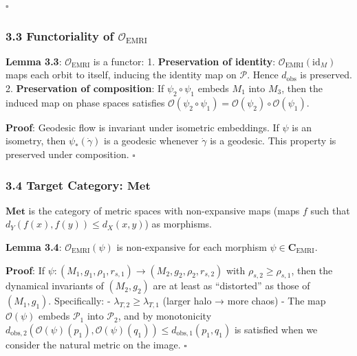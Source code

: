 \documentclass[
]{article}
\begin{document}
\(\square\)

\subsubsection{\texorpdfstring{3.3 Functoriality of
\(\mathcal{O}_{\text{EMRI}}\)}{3.3 Functoriality of \textbackslash mathcal\{O\}\_\{\textbackslash text\{EMRI\}\}}}\label{functoriality-of-mathcalo_textemri}

\textbf{Lemma 3.3}: \(\mathcal{O}_{\text{EMRI}}\) is a functor: 1.
\textbf{Preservation of identity}:
\(\mathcal{O}_{\text{EMRI}}(\text{id}_M)\) maps each orbit to itself,
inducing the identity map on \(\mathcal{P}\). Hence \(d_{\text{obs}}\)
is preserved. 2. \textbf{Preservation of composition}: If
\(\psi_2 \circ \psi_1\) embeds \(M_1\) into \(M_3\), then the induced
map on phase spaces satisfies
\(\mathcal{O}(\psi_2 \circ \psi_1) = \mathcal{O}(\psi_2) \circ \mathcal{O}(\psi_1)\).

\textbf{Proof}: Geodesic flow is invariant under isometric embeddings.
If \(\psi\) is an isometry, then \(\psi_*(\dot{\gamma})\) is a geodesic
whenever \(\dot{\gamma}\) is a geodesic. This property is preserved
under composition. \(\square\)

\subsubsection{\texorpdfstring{3.4 Target Category:
\(\mathbf{Met}\)}{3.4 Target Category: \textbackslash mathbf\{Met\}}}\label{target-category-mathbfmet}

\(\mathbf{Met}\) is the category of metric spaces with non-expansive
maps (maps \(f\) such that \(d_Y(f(x), f(y)) \leq d_X(x, y)\)) as
morphisms.

\textbf{Lemma 3.4}: \(\mathcal{O}_{\text{EMRI}}(\psi)\) is non-expansive
for each morphism \(\psi \in \mathbf{C}_{\text{EMRI}}\).

\textbf{Proof}: If
\(\psi: (M_1, g_1, \rho_1, r_{s,1}) \to (M_2, g_2, \rho_2, r_{s,2})\)
with \(\rho_{s,2} \geq \rho_{s,1}\), then the dynamical invariants of
\((M_2, g_2)\) are at least as ``distorted'' as those of \((M_1, g_1)\).
Specifically: - \(\lambda_{T,2} \geq \lambda_{T,1}\) (larger halo → more
chaos) - The map \(\mathcal{O}(\psi)\) embeds \(\mathcal{P}_1\) into
\(\mathcal{P}_2\), and by monotonicity
\(d_{\text{obs},2}(\mathcal{O}(\psi)(p_1), \mathcal{O}(\psi)(q_1)) \leq d_{\text{obs},1}(p_1, q_1)\)
is satisfied when we consider the natural metric on the image.
\(\square\)
\end{document}
